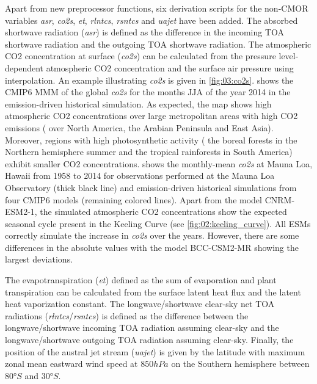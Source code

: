 Apart from new preprocessor functions, six derivation scripts for the
non-\ac{CMOR} variables \emph{asr}, \emph{co2s}, \emph{et}, \emph{rlntcs},
\emph{rsntcs} and \emph{uajet} have been added. The absorbed shortwave
radiation (\emph{asr}) is defined as the difference in the incoming \ac{TOA}
shortwave radiation and the outgoing \ac{TOA} shortwave radiation. The
atmospheric \ac{CO2} concentration at surface (\emph{co2s}) can be calculated
from the pressure level-dependent atmospheric \ac{CO2} concentration and the
surface air pressure using interpolation. An example illustrating \emph{co2s}
is given in \cref{fig:03:co2s}.  shows the \acs{CMIP}6
\ac{MMM} of the global \emph{co2s} for the months \acf{JJA} of the year 2014 in
the emission-driven historical simulation. As expected, the map shows high
atmospheric \ac{CO2} concentrations over large metropolitan areas with high
\ac{CO2} emissions (\eg{} over North America, the Arabian Peninsula and East
Asia). Moreover, regions with high photosynthetic activity (\eg{} the boreal
forests in the Northern hemisphere summer and the tropical rainforests in South
America) exhibit smaller \ac{CO2} concentrations.  shows
the monthly-mean \emph{co2s} at Mauna Loa, Hawaii from 1958 to 2014 for
observations performed at the Mauna Loa Observatory \autocite{Keeling2005}
(thick black line) and emission-driven historical simulations from four
\acs{CMIP}6 models (remaining colored lines). Apart from the model CNRM-ESM2-1,
the simulated atmospheric \ac{CO2} concentrations show the expected seasonal
cycle present in the Keeling Curve (see \cref{fig:02:keeling_curve}). All
\acp{ESM} correctly simulate the increase in \emph{co2s} over the years.
However, there are some differences in the absolute values with the model
BCC-CSM2-MR showing the largest deviations.

The evapotranspiration (\emph{et}) defined as the sum of evaporation and plant
transpiration can be calculated from the surface latent heat flux and the
latent heat vaporization constant. The longwave/shortwave clear-sky net
\acf{TOA} radiations (\emph{rlntcs}/\emph{rsntcs}) is defined as the difference
between the longwave/shortwave incoming \ac{TOA} radiation assuming clear-sky
and the longwave/shortwave outgoing \ac{TOA} radiation assuming clear-sky.
Finally, the position of the austral jet stream (\emph{uajet}) is given by the
latitude with maximum zonal mean eastward wind speed at $850 \unit{hPa}$ on the
Southern hemisphere between $80 \unit{\degree S}$ and $30 \unit{\degree S}$.


